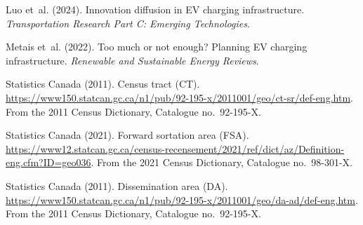 Luo et~al. (2024). Innovation diffusion in EV charging infrastructure.
\textit{Transportation Research Part C: Emerging Technologies}.

Metais et~al. (2022). Too much or not enough? Planning EV charging infrastructure.
\textit{Renewable and Sustainable Energy Reviews}.

Statistics Canada (2011). Census tract (CT).
\url{https://www150.statcan.gc.ca/n1/pub/92-195-x/2011001/geo/ct-sr/def-eng.htm}.
From the 2011 Census Dictionary, Catalogue no.\ 92-195-X.

Statistics Canada (2021). Forward sortation area (FSA).
\url{https://www12.statcan.gc.ca/census-recensement/2021/ref/dict/az/Definition-eng.cfm?ID=geo036}.
From the 2021 Census Dictionary, Catalogue no.\ 98-301-X.

Statistics Canada (2011). Dissemination area (DA).
\url{https://www150.statcan.gc.ca/n1/pub/92-195-x/2011001/geo/da-ad/def-eng.htm}.
From the 2011 Census Dictionary, Catalogue no.\ 92-195-X.

